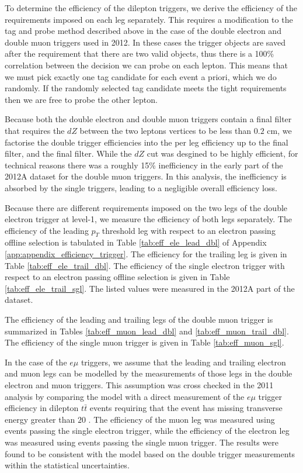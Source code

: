 
To determine the efficiency of the dilepton triggers, 
we derive the efficiency of the requirements imposed on each leg separately.
This requires a modification to the tag and probe method described above in 
the case of the double electron and double muon triggers used in 2012.
In these cases the trigger objects are saved after the requirement that there are two valid objects, 
thus there is a 100\% correlation between the decision we can probe on each lepton.
This means that we must pick exactly one tag candidate for each event a priori, which we do 
randomly. 
If the randomly selected tag candidate meets the tight requirements then we are free to 
probe the other lepton.

Because both the double electron and double muon triggers
contain a final filter that requires the $dZ$ between the two
leptons vertices to be less than $0.2$ cm, we factorise the double trigger
efficiencies into the per leg efficiency up to the final filter, 
and the final filter. While the $dZ$ cut was desgined to be highly efficient,
for technical reasons there was a roughly 15\% inefficiency in
the early part of the 2012A dataset for the double muon triggers.
  In this analysis, the inefficiency
is absorbed by the single triggers, leading to a negligible overall 
efficiency loss.

Because there are different requirements imposed on the two legs of the 
double electron trigger at level-1, we measure the efficiency of 
both legs separately.
The efficiency of the leading $p_T$ threshold leg with respect to an electron passing
offline selection is tabulated in 
Table \ref{tab:eff_ele_lead_dbl} of Appendix 
\ref{app:appendix_efficiency_trigger}. The efficiency for the trailing 
leg is given in Table \ref{tab:eff_ele_trail_dbl}. 
The efficiency of the single electron trigger with respect to
an electron passing offline selection is given in Table \ref{tab:eff_ele_trail_sgl}.
The listed values were measured in the 2012A part of the dataset.

The efficiency of the leading and trailing legs of the double muon trigger
is summarized in Tables \ref{tab:eff_muon_lead_dbl} and
\ref{tab:eff_muon_trail_dbl}. The efficiency of the single
muon trigger is given in Table \ref{tab:eff_muon_sgl}.

In the case of the $e\mu$ triggers, we assume that the leading
and trailing electron and muon legs can be modelled by the measurements
of those legs in the double electron and muon triggers. This assumption was cross 
checked in the 2011 analysis by comparing the model with
a direct measurement of the $e\mu$ trigger efficiency in
dilepton $t\bar{t}$ events requiring that the event has missing transverse
energy greater than $20$ \GeV.
The efficiency of 
the muon leg was measured using events passing the single electron trigger,
while the efficiency of the electron leg was measured using events passing the
single muon trigger. The results were found to be consistent
with the model based on the double trigger measurements within the 
statistical uncertainties. 


